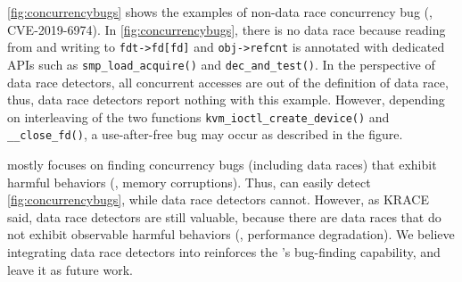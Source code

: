 


%
%
\autoref{fig:concurrencybugs} shows the examples of non-data race
concurrency bug (\ie, CVE-2019-6974).
%
In \autoref{fig:concurrencybugs}, there is no data race because
reading from and writing to \texttt{fdt->fd[fd]} and
\texttt{obj->refcnt} is annotated with dedicated APIs such as
\texttt{smp_load_acquire()} and \texttt{dec_and_test()}.
%
In the perspective of data race detectors, all concurrent accesses are
out of the definition of data race, thus, data race detectors report
nothing with this example.
%
However, depending on interleaving of the two functions
\texttt{kvm_ioctl_create_device()} and \texttt{__close_fd()}, a
use-after-free bug may occur as described in the figure.



%
\sys mostly focuses on finding concurrency bugs (including data races)
that exhibit harmful behaviors (\eg, memory corruptions). Thus, \sys
can easily detect \autoref{fig:concurrencybugs}, while data race
detectors cannot.
%
However, as KRACE said, data race detectors are still valuable,
because there are data races that do not exhibit observable harmful
behaviors (\ie, performance degradation).
%
We believe integrating data race detectors into \sys reinforces the
\sys's bug-finding capability, and leave it as future work.


